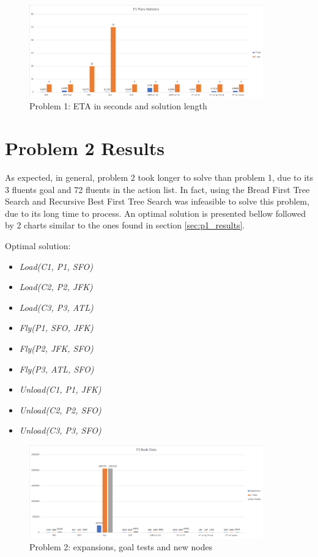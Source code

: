 \begin{figure}[ht]
	\centering
	\includegraphics[width=0.9\textwidth]{images/P1_plan_statistics.png}
	\caption{Problem 1: ETA in seconds and solution length}
	\label{fig:p1_plan_statistics}
\end{figure}

\section{Problem 2 Results}\label{sec:p2_results}

As expected, in general, problem 2 took longer to solve than problem 1, due to its 3 fluents goal and 72 fluents in the action list. In fact, using the Bread First Tree Search and Recursive Best First Tree Search was infeasible to solve this problem, due to its long time to process. An optimal solution is presented bellow followed by 2 charts similar to the ones found in section \ref{sec:p1_results}.

\begin{flushleft}
	Optimal solution:
	\begin{itemize}
		\item \textit{Load(C1, P1, SFO)}
		\item \textit{Load(C2, P2, JFK)}
		\item \textit{Load(C3, P3, ATL)}
		\item \textit{Fly(P1, SFO, JFK)}
		\item \textit{Fly(P2, JFK, SFO)}
		\item \textit{Fly(P3, ATL, SFO)}
		\item \textit{Unload(C1, P1, JFK)}
		\item \textit{Unload(C2, P2, SFO)}
		\item \textit{Unload(C3, P3, SFO)}
	\end{itemize}
\end{flushleft}

\begin{figure}[ht]
	\centering
	\includegraphics[width=0.9\textwidth]{images/P2_node_data.png}
	\caption{Problem 2: expansions, goal tests and new nodes}
	\label{fig:p2_node_data}
\end{figure}

